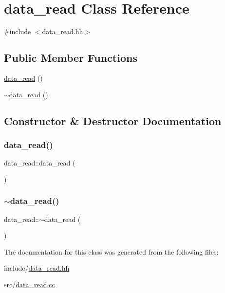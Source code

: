 \hypertarget{classdata__read}{}\section{data\+\_\+read Class Reference}
\label{classdata__read}


{\ttfamily \#include $<$data\+\_\+read.\+hh$>$}

\subsection*{Public Member Functions}
\begin{DoxyCompactItemize}
\item 
\mbox{\hyperlink{classdata__read_a680a0d19f4ce5b8a4f45e9e8558bc576}{data\+\_\+read}} ()
\item 
\mbox{\hyperlink{classdata__read_aa401f5929f546d0e74ee2aea7640732c}{$\sim$data\+\_\+read}} ()
\end{DoxyCompactItemize}


\subsection{Constructor \& Destructor Documentation}
\mbox{\label{classdata__read_a680a0d19f4ce5b8a4f45e9e8558bc576}} 
\subsubsection{\texorpdfstring{data\+\_\+read()}{data\_read()}}
{\footnotesize\ttfamily data\+\_\+read\+::data\+\_\+read (\begin{DoxyParamCaption}{ }\end{DoxyParamCaption})}

\mbox{\label{classdata__read_aa401f5929f546d0e74ee2aea7640732c}} 
\subsubsection{\texorpdfstring{$\sim$data\+\_\+read()}{~data\_read()}}
{\footnotesize\ttfamily data\+\_\+read\+::$\sim$data\+\_\+read (\begin{DoxyParamCaption}{ }\end{DoxyParamCaption})}



The documentation for this class was generated from the following files\+:\begin{DoxyCompactItemize}
\item 
include/\mbox{\hyperlink{data__read_8hh}{data\+\_\+read.\+hh}}\item 
src/\mbox{\hyperlink{data__read_8cc}{data\+\_\+read.\+cc}}\end{DoxyCompactItemize}
